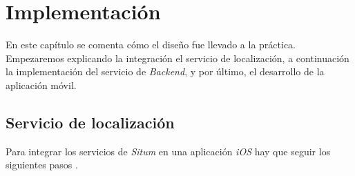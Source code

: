 \chapter{Implementación}

En este capítulo se comenta cómo el diseño fue llevado a la práctica.
Empezaremos explicando la integración el servicio de localización, a continuación la implementación del servicio de \textit{Backend}, y por último, el  desarrollo de la aplicación móvil.

\section{Servicio de localización}
Para integrar los servicios de \textit{Situm} en una aplicación \textit{iOS} hay que seguir los siguientes pasos \cite{noauthor_situm_nodate}.


